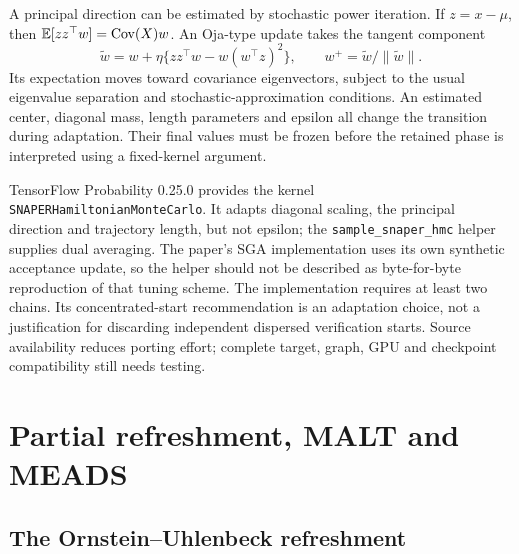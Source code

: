 A principal direction can be estimated by stochastic power iteration. If
$z=x-\mu$, then $\mathbb{E}[zz^\top w]=\operatorname{Cov}(X)w$. An Oja-type update takes the
tangent component
\begin{equation}
 \widetilde w=w+\eta\{zz^\top w-w(w^\top z)^2\},\qquad
 w^+=\widetilde w/\|\widetilde w\|.
 \label{eq:bf-modern-oja}
\end{equation}
Its expectation moves toward covariance eigenvectors, subject to the usual
eigenvalue separation and stochastic-approximation conditions. An estimated
center, diagonal mass, length parameters and epsilon all change the
transition during adaptation. Their final values must be frozen before the
retained phase is interpreted using a fixed-kernel argument.

TensorFlow Probability 0.25.0 provides the kernel
\texttt{SNAPER\allowbreak Hamiltonian\allowbreak MonteCarlo}.
It adapts diagonal scaling,
the principal direction and trajectory length, but not epsilon; the
\texttt{sample\_snaper\_hmc} helper supplies dual averaging. The paper's
SGA implementation uses its own synthetic acceptance update, so the helper
should not be described as byte-for-byte reproduction of that tuning scheme.
The implementation requires at least two chains. Its concentrated-start
recommendation is an adaptation choice, not a justification for discarding
independent dispersed verification starts. Source availability reduces porting
effort; complete target, graph, GPU and checkpoint compatibility still needs
testing.

\section{Partial refreshment, MALT and MEADS}
\label{sec:bf-modern-persistence}

\subsection{The Ornstein--Uhlenbeck refreshment}

